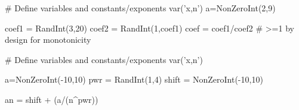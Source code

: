 \begin{sagesilent}
# Define variables and constants/exponents
var('x,n')
a=NonZeroInt(2,9)

coef1 = RandInt(3,20)
coef2 = RandInt(1,coef1)
coef = coef1/coef2 # >=1 by design for monotonicity

\end{sagesilent}







%
%
%
%
%
%
%
%
%
%
%
%
%
%
%
%
%



\begin{sagesilent}
# Define variables and constants/exponents
var('x,n')


a=NonZeroInt(-10,10)
pwr = RandInt(1,4)
shift = NonZeroInt(-10,10)

an = shift + (a/(n^pwr))



\end{sagesilent}

